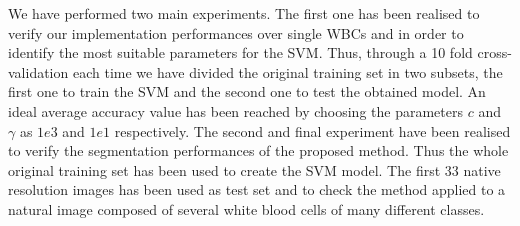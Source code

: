\documentclass[final,a4paper,12pt,english]{UnicaPhdThesis3}
\begin{document}
We have performed two main experiments. The first one has been realised to verify our implementation performances over single WBCs and in order to identify the most suitable parameters for the SVM. Thus, through a 10 fold cross-validation each time we have divided the original training set in two subsets, the first one to train the SVM and the second one to test the obtained model. An ideal average accuracy value has been reached by choosing the parameters $c$ and $\gamma$ as $1e3$ and $1e1$ respectively. 
The second and final experiment have been realised to verify the segmentation performances of the proposed method. Thus the whole original training set has been used to create the SVM model. The first 33 native resolution images has been used as test set and to check the method applied to a natural image composed of several white blood cells of many different classes. 
\end{document}
